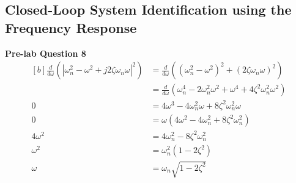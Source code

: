 \documentclass[12pt]{article}
\begin{document}
\subsection{Closed-Loop System Identification using the Frequency Response}
\textbf{Pre-lab Question 8} \\
\begin{equation}
\begin{aligned}[b]
    \frac{d}{d\omega} \left( \left|\omega_n^2 - \omega^2 + j2\zeta\omega_n\omega \right|^2 \right) &= \frac{d}{d\omega} \left( (\omega_n^2 - \omega^2)^2 + (2 \zeta \omega_n \omega)^2 \right) \\
    &= \frac{d}{d\omega} \left( \omega_n^4 - 2\omega_n^2\omega^2 + \omega^4 + 4\zeta^2\omega_n^2\omega^2 \right) \\
    0 &= 4\omega^3 - 4\omega_n^2\omega + 8\zeta^2\omega_n^2\omega \\
    0 &= \omega \left( 4\omega^2 - 4\omega_n^2 + 8\zeta^2\omega_n^2 \right) \\
    4\omega^2 &= 4\omega_n^2 - 8\zeta^2\omega_n^2 \\
    \omega^2 &= \omega_n^2 \left( 1 - 2\zeta^2 \right) \\
    \omega &= \omega_n \sqrt{1 - 2\zeta^2}
\end{aligned}
\end{equation}

\end{document}
